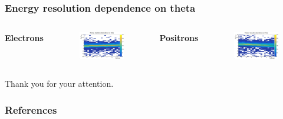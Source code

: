\documentclass{beamer}
\begin{document}
	\begin{frame}
		\frametitle{Energy resolution dependence on theta}
		\begin{columns}
			\centering
			\Large \textbf{Electrons}
			\begin{figure}
				\centering
				\includegraphics[width = 0.95 \linewidth]{../images/e_deltaenergy_theta_all.png}
			\end{figure}
			\centering
			\Large \textbf{Positrons}
			\begin{figure}
				\centering
				\includegraphics[width = 0.95 \linewidth]{../images/p_deltaenergy_theta_all.png}
			\end{figure}
		\end{columns}
	\end{frame}
	
	{
		\begin{frame}[noframenumbering]{}
			\begin{center}
				\Huge Thank you for your attention.
			\end{center}
		\end{frame}
	}
	
	\begin{frame}
		\frametitle{References}
		
		
	\end{frame}
	
\end{document}
